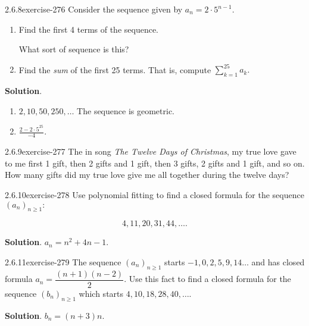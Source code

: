 \documentclass[twoside,11pt,]{book}
\numberwithin{equation}{chapter}
\begin{document}
\begin{divisionsolution}{2.6.8}{}{exercise-276}%
\hypertarget{p-3789}{}%
Consider the sequence given by \(a_n = 2\cdot 5^{n-1}\text{.}\)\leavevmode%
\begin{enumerate}[label=(\alph*)]
\item\hypertarget{li-2018}{}\hypertarget{p-3790}{}%
Find the first 4 terms of the sequence.%
\par
\hypertarget{p-3791}{}%
What sort of sequence is this?%
\par
\hypertarget{p-3792}{}%
%
\item\hypertarget{li-2023}{}\hypertarget{p-3793}{}%
Find the \emph{sum} of the first 25 terms. That is, compute \(\sum_{k=1}^{25}a_k\text{.}\)%
\end{enumerate}
%
\par\smallskip%
\noindent\textbf{Solution}.\quad%
\hypertarget{p-3795}{}%
\leavevmode%
\begin{enumerate}[label=(\alph*)]
\item\hypertarget{li-2024}{}\hypertarget{p-3796}{}%
\(2, 10, 50, 250, \ldots\) The sequence is geometric.%
\item\hypertarget{li-2025}{}\hypertarget{p-3797}{}%
\(\frac{2 - 2\cdot 5^{25}}{-4}\text{.}\)%
\end{enumerate}
%
\end{divisionsolution}%
\begin{divisionsolution}{2.6.9}{}{exercise-277}%
\hypertarget{p-3798}{}%
The in song \emph{The Twelve Days of Christmas}, my true love gave to me first 1 gift, then 2 gifts and 1 gift, then 3 gifts, 2 gifts and 1 gift, and so on. How many gifts did my true love give me all together during the twelve days?%
\end{divisionsolution}%
\begin{divisionsolution}{2.6.10}{}{exercise-278}%
\hypertarget{p-3801}{}%
Use polynomial fitting to find a closed formula for the sequence \((a_n)_{n\ge 1}\text{:}\)%
\par
\hypertarget{p-3802}{}%
%
\begin{equation*}
4, 11, 20, 31, 44, \ldots
\text{.}
\end{equation*}
%
\par\smallskip%
\noindent\textbf{Solution}.\quad%
\hypertarget{p-3803}{}%
\(a_n = n^2 + 4n - 1\text{.}\)%
\end{divisionsolution}%
\begin{divisionsolution}{2.6.11}{}{exercise-279}%
\hypertarget{p-3806}{}%
The sequence \((a_n)_{n \ge 1}\) starts \(-1, 0, 2, 5, 9, 14\ldots\) and has closed formula \(a_n = \dfrac{(n+1)(n-2)}{2}\text{.}\) Use this fact to find a closed formula for the sequence \((b_n)_{n \ge 1}\) which starts \(4, 10, 18, 28, 40, \ldots\text{.}\)%
\par\smallskip%
\noindent\textbf{Solution}.\quad%
\hypertarget{p-3807}{}%
\(b_n = (n+3)n\text{.}\)%
\end{divisionsolution}%
\end{document}
